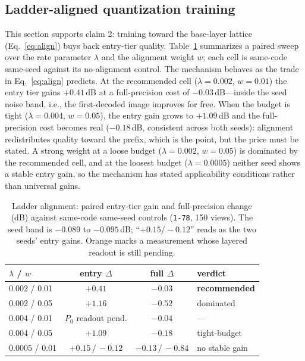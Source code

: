 \subsection{Ladder-aligned quantization training}
\label{sec:align-exp}

This section supports claim 2: training toward the base-layer lattice (Eq.~\ref{eq:align}) buys back entry-tier quality.
Table~\ref{tab:align} summarizes a paired sweep over the rate parameter $\lambda$ and the alignment weight $w$; each cell is same-code same-seed against its no-alignment control.
The mechanism behaves as the trade in Eq.~\eqref{eq:align} predicts.
At the recommended cell ($\lambda{=}0.002$, $w{=}0.01$) the entry tier gains $+0.41$\,dB at a full-precision cost of $-0.03$\,dB---inside the seed noise band, i.e., the first-decoded image improves for free.
When the budget is tight ($\lambda{=}0.004$, $w{=}0.05$), the entry gain grows to $+1.09$\,dB and the full-precision cost becomes real ($-0.18$\,dB, consistent across both seeds): alignment redistributes quality toward the prefix, which is the point, but the price must be stated.
A strong weight at a loose budget ($\lambda{=}0.002$, $w{=}0.05$) is dominated by the recommended cell, and at the loosest budget ($\lambda{=}0.0005$) neither seed shows a stable entry gain, so the mechanism has stated applicability conditions rather than universal gains.

\begin{table}[t]
\centering
\caption{Ladder alignment: paired entry-tier gain and full-precision change (dB) against same-code same-seed controls (\texttt{1-78}, 150 views).
The seed band is $-0.089$ to $-0.095$\,dB; ``$+0.15/-0.12$'' reads as the two seeds' entry gains. Orange marks a measurement whose layered readout is still pending.}
\label{tab:align}
\setlength{\tabcolsep}{2.6pt}
\footnotesize
\begin{tabular}{lccl}
\toprule
$\lambda$ / $w$ & entry $\Delta$ & full $\Delta$ & verdict \\
\midrule
0.002 / 0.01 & $+0.41$ & $-0.03$ & \textbf{recommended} \\
0.002 / 0.05 & $+1.16$ & $-0.52$ & dominated \\
0.004 / 0.01 & {\color{orange}$P_0$ readout pend.} & $-0.04$ & --- \\
0.004 / 0.05 & $+1.09$ & $-0.18$ & tight-budget \\
0.0005 / 0.01 & $+0.15\,/\,-0.12$ & $-0.13\,/\,-0.84$ & no stable gain \\
\bottomrule
\end{tabular}
\end{table}

